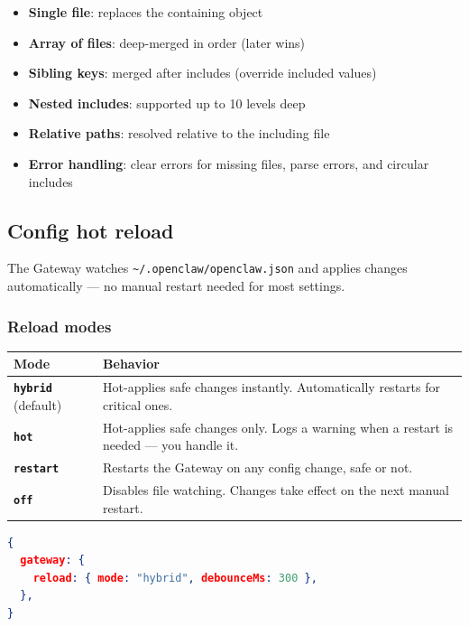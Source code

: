 \begin{itemize}
  \item \textbf{Single file}: replaces the containing object
  \item \textbf{Array of files}: deep-merged in order (later wins)
  \item \textbf{Sibling keys}: merged after includes (override included values)
  \item \textbf{Nested includes}: supported up to 10 levels deep
  \item \textbf{Relative paths}: resolved relative to the including file
  \item \textbf{Error handling}: clear errors for missing files, parse errors, and circular includes
\end{itemize}



\subsection{Config hot reload}


The Gateway watches \texttt{\textasciitilde{}/.openclaw/openclaw.json} and applies changes automatically — no manual restart needed for most settings.

\subsubsection{Reload modes}



\begin{table}[h]
\centering
\small
\begin{tabular}{|l|l|}
\hline
Mode & Behavior \\
\hline
\textbf{\texttt{hybrid}} (default) & Hot-applies safe changes instantly. Automatically restarts for critical ones. \\
\hline
\textbf{\texttt{hot}} & Hot-applies safe changes only. Logs a warning when a restart is needed — you handle it. \\
\hline
\textbf{\texttt{restart}} & Restarts the Gateway on any config change, safe or not. \\
\hline
\textbf{\texttt{off}} & Disables file watching. Changes take effect on the next manual restart. \\
\hline
\end{tabular}
\end{table}



\begin{lstlisting}[language=json]
{
  gateway: {
    reload: { mode: "hybrid", debounceMs: 300 },
  },
}
\end{lstlisting}


